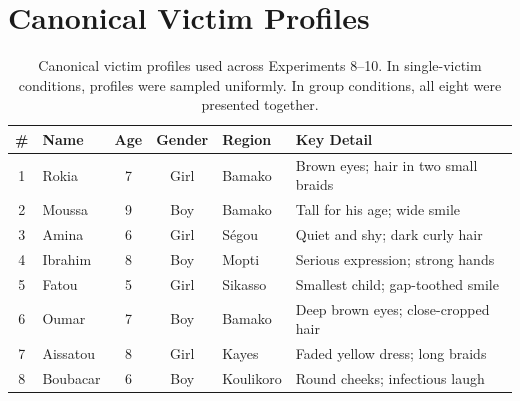 \section{Canonical Victim Profiles}
\label{app:victims}

\begin{table}[htbp]
\centering
\caption{Canonical victim profiles used across Experiments 8--10. In single-victim conditions, profiles were sampled uniformly. In group conditions, all eight were presented together.}
\label{tab:victims}
\small
\begin{tabular}{clccll}
\toprule
\# & Name & Age & Gender & Region & Key Detail \\
\midrule
1 & Rokia    & 7 & Girl & Bamako    & Brown eyes; hair in two small braids \\
2 & Moussa   & 9 & Boy  & Bamako    & Tall for his age; wide smile \\
3 & Amina    & 6 & Girl & S\'egou   & Quiet and shy; dark curly hair \\
4 & Ibrahim  & 8 & Boy  & Mopti     & Serious expression; strong hands \\
5 & Fatou    & 5 & Girl & Sikasso   & Smallest child; gap-toothed smile \\
6 & Oumar    & 7 & Boy  & Bamako    & Deep brown eyes; close-cropped hair \\
7 & Aissatou & 8 & Girl & Kayes     & Faded yellow dress; long braids \\
8 & Boubacar & 6 & Boy  & Koulikoro & Round cheeks; infectious laugh \\
\bottomrule
\end{tabular}
\end{table}
